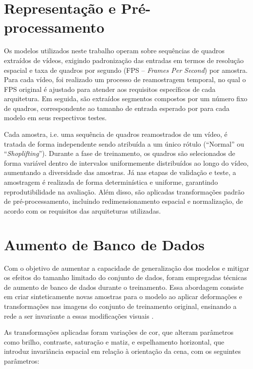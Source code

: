 \documentclass[12pt, %
openright, 
oneside, %
a4paper,    %
brazil]{facom-ufu-abntex2}
\begin{document}
\section[Representação e Pré-processamento]{Representação e Pré-processamento}

Os modelos utilizados neste trabalho operam sobre sequências de quadros extraídos de vídeos, exigindo padronização das entradas em termos de resolução espacial e taxa de quadros por segundo (FPS -- \textit{Frames Per Second}) por amostra. Para cada vídeo, foi realizado um processo de reamostragem temporal, no qual o FPS original é ajustado para atender aos requisitos específicos de cada arquitetura. Em seguida, são extraídos segmentos compostos por um número fixo de quadros, correspondente ao tamanho de entrada esperado por para cada modelo em seus respectivos testes.

Cada amostra, i.e. uma sequência de quadros reamostrados de um vídeo, é tratada de forma independente sendo atribuída a um único rótulo (“Normal” ou “\textit{Shoplifting}”). Durante a fase de treinamento, os quadros são selecionados de forma variável dentro de intervalos uniformemente distribuídos ao longo do vídeo, aumentando a diversidade das amostras. Já nas etapas de validação e teste, a amostragem é realizada de forma determinística e uniforme, garantindo reprodutibilidade na avaliação. Além disso, são aplicadas transformações padrão de pré-processamento, incluindo redimensionamento espacial e normalização, de acordo com os requisitos das arquiteturas utilizadas.

\section[Aumento de Banco de Dados]{Aumento de Banco de Dados}

Com o objetivo de aumentar a capacidade de generalização dos modelos e mitigar os efeitos do tamanho limitado do conjunto de dados, foram empregadas técnicas de aumento de banco de dados durante o treinamento. Essa abordagem consiste em criar sinteticamente novas amostras para o modelo ao aplicar deformações e transformações nas imagens do conjunto de treinamento original, ensinando a rede a ser invariante a essas modificações visuais \cite{goodfellow}.

As transformações aplicadas foram variações de cor, que alteram parâmetros como brilho, contraste, saturação e matiz, e espelhamento horizontal, que introduz invariância espacial em relação à orientação da cena, com os seguintes parâmetros:
\end{document}
